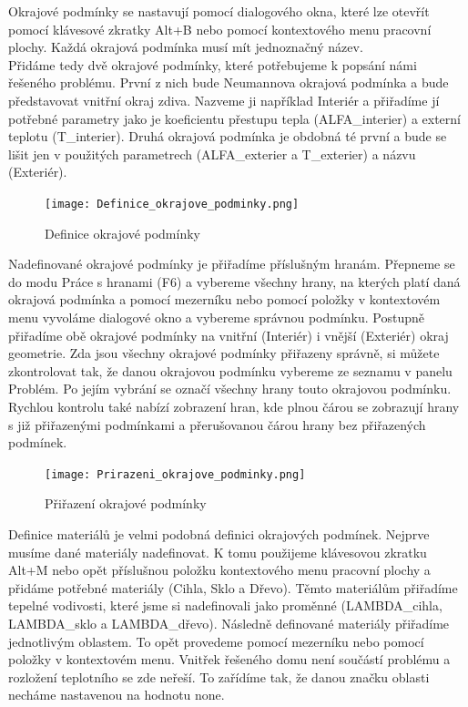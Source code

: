 \documentclass[a4paper, oneside]{article}
\begin{document}
	Okrajové podmínky se nastavují pomocí dialogového okna, které lze otevřít pomocí klávesové zkratky Alt+B nebo pomocí kontextového menu pracovní plochy. Každá okrajová podmínka musí mít jednoznačný název.\\
	Přidáme tedy dvě okrajové podmínky, které potřebujeme k popsání námi řešeného problému. První z nich bude Neumannova okrajová podmínka a bude představovat vnitřní okraj zdiva. Nazveme ji například Interiér a přiřadíme jí potřebné parametry jako je koeficientu přestupu tepla (ALFA\_interier) a externí teplotu (T\_interier). Druhá okrajová podmínka je obdobná té první a bude se lišit jen v použitých parametrech (ALFA\_exterier a T\_exterier) a názvu (Exteriér).\\
	
\begin{figure}[htbp]
\centering
\texttt{[image: Definice\_okrajove\_podminky.png]}\\
\caption{Definice okrajové podmínky}
\end{figure}

	Nadefinované okrajové podmínky je přiřadíme příslušným hranám. Přepneme se do modu Práce s hranami (F6) a vybereme všechny hrany, na kterých platí daná okrajová podmínka a pomocí mezerníku nebo pomocí položky v kontextovém menu vyvoláme dialogové okno a vybereme správnou podmínku. Postupně přiřadíme obě okrajové podmínky na vnitřní (Interiér) i vnější (Exteriér) okraj geometrie. Zda jsou všechny okrajové podmínky přiřazeny správně, si můžete zkontrolovat tak, že danou okrajovou podmínku vybereme ze seznamu v panelu Problém. Po jejím vybrání se označí všechny hrany touto okrajovou podmínku. Rychlou kontrolu také nabízí zobrazení hran, kde plnou čárou se zobrazují hrany s již přiřazenými podmínkami a přerušovanou čárou hrany bez přiřazených podmínek.\\
	
\begin{figure}[htbp]
\centering
\texttt{[image: Prirazeni\_okrajove\_podminky.png]}\\
\caption{Přiřazení okrajové podmínky}
\end{figure}

	Definice materiálů je velmi podobná definici okrajových podmínek. Nejprve musíme dané materiály nadefinovat. K tomu použijeme klávesovou zkratku Alt+M nebo opět příslušnou položku kontextového menu pracovní plochy a přidáme potřebné materiály (Cihla, Sklo a Dřevo). Těmto materiálům přiřadíme tepelné vodivosti, které jsme si nadefinovali jako proměnné (LAMBDA\_cihla, LAMBDA\_sklo a LAMBDA\_dřevo). Následně definované materiály přiřadíme jednotlivým oblastem. To opět provedeme pomocí mezerníku nebo pomocí položky v kontextovém menu. Vnitřek řešeného domu není součástí problému a rozložení teplotního se zde neřeší. To zařídíme tak, že danou značku oblasti necháme nastavenou na hodnotu none.\\
	
\end{document}
